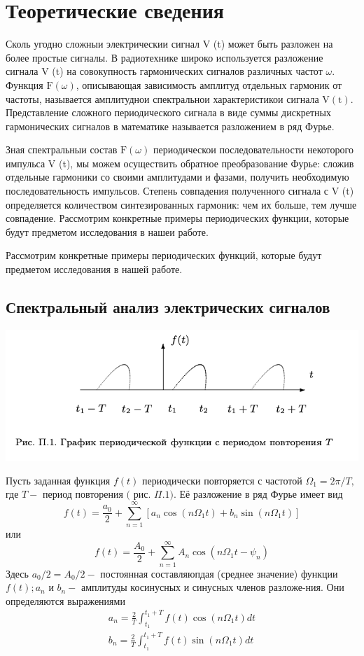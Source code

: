\documentclass[a4paper, 12pt]{article}%
\begin{document}
\section{Теоретические сведения}

Сколь угодно сложныи электрическии сигнал $\mathrm{V}$ (t) может быть разложен на более простые сигналы. В радиотехнике широко используется разложение сигнала V (t) на совокупность гармонических сигналов различных частот $\omega .$ Функция $\mathrm{F}(\omega)$, описывающая зависимость амплитуд отдельных гармоник от частоты, называется амплитуднои спектральнои характеристикои сигнала $\mathrm{V}(\mathrm{t})$. Представление сложного периодического сигнала в виде суммы дискретных гармонических сигналов в математике называется разложением в ряд Фурье.

Зная спектральныи состав $\mathrm{F}(\omega)$ периодическои последовательности некоторого импульса V (t), мы можем осуществить обратное преобразование Фурье: сложив отдельные гармоники со своими амплитудами и фазами, получить необходимую последовательность импульсов. Степень совпадения полученного сигнала с V (t) определяется количеством синтезированных гармоник: чем их больше, тем лучше совпадение.
Рассмотрим конкретные примеры периодических функции, которые будут предметом исследования в нашеи работе.

Рассмотрим конкретные примеры периодических функций, которые будут предметом исследования в нашей работе.

\subsection{Спектральный анализ электрических сигналов}

\begin{center}
\includegraphics[width=0.7\linewidth]{./anat/1.jpg}\\
\end{center}

Пусть заданная функция $f(t)$ периодически повторяется с частотой $\Omega_{1}=2 \pi / T,$ где $T-$ период повторения $($ рис. $\Pi .1) .$ Её разложение в ряд Фурье имеет вид
$$
f(t)=\frac{a_{0}}{2}+\sum_{n=1}^{\infty}\left[a_{n} \cos \left(n \Omega_{1} t\right)+b_{n} \sin \left(n \Omega_{1} t\right)\right]
$$
или
$$
f(t)=\frac{A_{0}}{2}+\sum_{n=1}^{\infty} A_{n} \cos \left(n \Omega_{1} t-\psi_{n}\right)
$$
Здесь $a_{0} / 2=A_{0} / 2-$ постоянная составляюпдая (среднее значение) функции $f(t) ; a_{n}$ и $b_{n}-$ амплитуды косинусных и синусных членов разложе-ния. Они определяются выражениями
$$
\begin{array}{l}
a_{n}=\frac{2}{T} \int_{t_{1}}^{t_{1}+T} f(t) \cos \left(n \Omega_{1} t\right) d t \\
b_{n}=\frac{2}{T} \int_{t_{1}}^{t_{1}+T} f(t) \sin \left(n \Omega_{1} t\right) d t
\end{array}
$$
\end{document}
